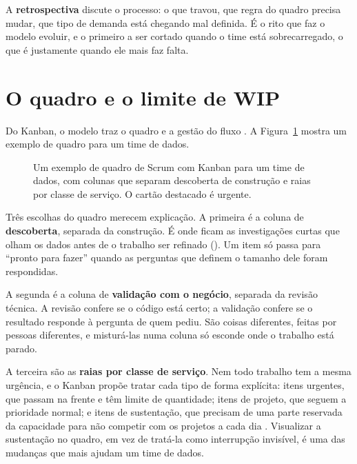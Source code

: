 A \textbf{retrospectiva} discute o processo: o que travou, que regra do quadro precisa mudar,
que tipo de demanda está chegando mal definida. É o rito que faz o modelo evoluir, e o
primeiro a ser cortado quando o time está sobrecarregado, o que é justamente quando ele mais
faz falta.


\section{O quadro e o limite de WIP}
\label{sec:quadro-wip}

Do Kanban, o modelo traz o quadro e a gestão do fluxo \parencite{anderson2010}. A
Figura~\ref{fig:quadro-scrumban} mostra um exemplo de quadro para um time de dados.

\begin{figure}[htbp]
  \centering
  
  \caption{Um exemplo de quadro de Scrum com Kanban para um time de dados, com colunas que
    separam descoberta de construção e raias por classe de serviço. O cartão destacado é
    urgente.}
  \label{fig:quadro-scrumban}
\end{figure}

Três escolhas do quadro merecem explicação. A primeira é a coluna de \textbf{descoberta},
separada da construção. É onde ficam as investigações curtas que olham os dados antes de o
trabalho ser refinado (). Um item só passa para \enquote{pronto para
fazer} quando as perguntas que definem o tamanho dele foram respondidas.

A segunda é a coluna de \textbf{validação com o negócio}, separada da revisão técnica. A
revisão confere se o código está certo; a validação confere se o resultado responde à pergunta
de quem pediu. São coisas diferentes, feitas por pessoas diferentes, e misturá-las numa coluna
só esconde onde o trabalho está parado.

A terceira são as \textbf{raias por classe de serviço}. Nem todo trabalho tem a mesma
urgência, e o Kanban propõe tratar cada tipo de forma explícita: itens urgentes, que passam na
frente e têm limite de quantidade; itens de projeto, que seguem a prioridade normal; e itens
de sustentação, que precisam de uma parte reservada da capacidade para não competir com os
projetos a cada dia \parencite{anderson2010}. Visualizar a sustentação no quadro, em vez de
tratá-la como interrupção invisível, é uma das mudanças que mais ajudam um time de dados.

